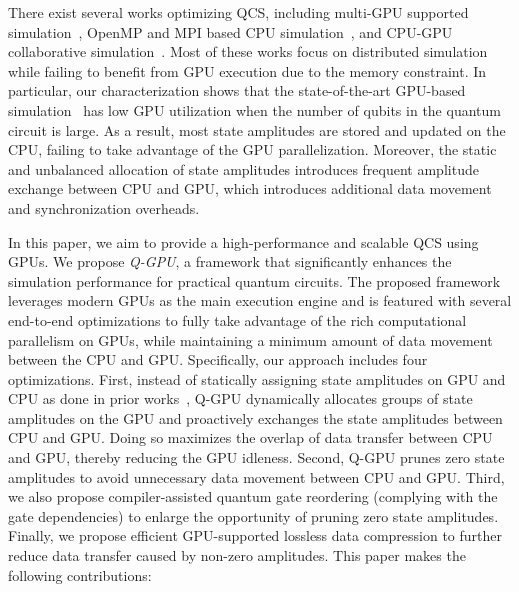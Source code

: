 \begin{sloppypar}
There exist several works optimizing QCS, including multi-GPU supported simulation~\cite{10.1109/SC41405.2020.00017,10.1007/978-3-319-68505-2_8}, OpenMP and MPI based CPU simulation~\cite{10.1145/3126908.3126947,10.1145/3295500.3356155,10.48550/arXiv.1710.05867}, and CPU-GPU collaborative simulation~\cite{10.1145/3310273.3323053}. Most of these works focus on distributed simulation while failing to benefit from GPU execution due to the memory constraint. 
In particular, our characterization shows that the state-of-the-art GPU-based simulation~\cite{10.1145/3310273.3323053} has low GPU utilization when the number of qubits in the quantum circuit is large. As a result, most state amplitudes are stored and updated on the CPU, failing to take advantage of the GPU parallelization. Moreover, the static and unbalanced allocation of state amplitudes introduces frequent amplitude exchange between CPU and GPU, which introduces additional data movement and synchronization overheads. 
\end{sloppypar}

\par In this paper, we aim to provide a high-performance and scalable QCS using GPUs.
We propose \emph{Q-GPU}, a framework that significantly enhances the simulation performance for practical quantum circuits. The proposed framework leverages modern GPUs as the main execution engine and is featured with several end-to-end optimizations to fully take advantage of the rich computational parallelism on GPUs, while maintaining a minimum amount of data movement between the CPU and GPU. Specifically, our approach includes four optimizations. 
First, instead of statically assigning state amplitudes on GPU and CPU as done in prior works~\cite{10.1145/3310273.3323053}, Q-GPU dynamically allocates groups of state amplitudes on the GPU and proactively exchanges the state amplitudes between CPU and GPU. Doing so maximizes the overlap of data transfer between CPU and GPU, thereby reducing the GPU idleness. 
Second, Q-GPU prunes zero state amplitudes to avoid unnecessary data movement between CPU and GPU. 
Third, we also propose compiler-assisted quantum gate reordering (complying with the gate dependencies) to enlarge the opportunity of pruning zero state amplitudes. 
Finally, we propose efficient GPU-supported lossless data compression to further reduce data transfer caused by non-zero amplitudes. This paper makes the following contributions: 

